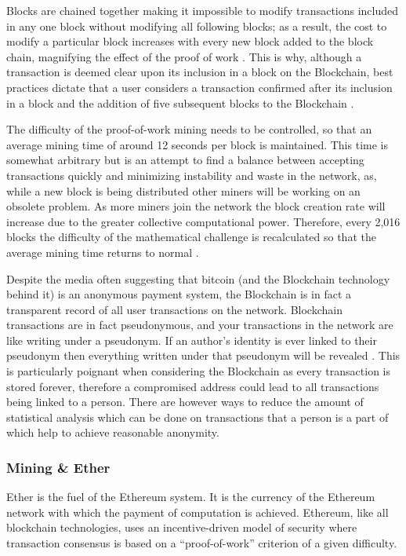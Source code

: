 \documentclass{article}
\begin{document}
Blocks are chained together making it impossible to modify transactions included in any one block without modifying all following blocks; as a result, the cost to modify a particular block increases with every new block added to the block chain, magnifying the effect of the proof of work \citep{20_developer_guide_bitcoin_2016}\citep{38_proof_of_work_-_masterpage_2016}. This is why, although a transaction is deemed clear upon its inclusion in a block on the Blockchain, best practices dictate that a user considers a transaction confirmed after its inclusion in a block and the addition of five subsequent blocks to the Blockchain \citep{27_confirmation_-_bitcoin_wiki_2016}.

The difficulty of the proof-of-work mining needs to be controlled, so that an average mining time of around 12 seconds per block is maintained. This time is somewhat arbitrary but is an attempt to find a balance between accepting transactions quickly and minimizing instability and waste in the network, as, while a new block is being distributed other miners will be working on an obsolete problem. As more miners join the network the block creation rate will increase due to the greater collective computational power. Therefore, every 2,016 blocks the difficulty of the mathematical challenge is recalculated so that the average mining time returns to normal \citep{20_developer_guide_bitcoin_2016}\citep{26_blockchain_mining_-_distributed_ledgers_and_blockchain_technology_2016}.

Despite the media often suggesting that bitcoin (and the Blockchain technology behind it) is an anonymous payment system, the Blockchain is in fact a transparent record of all user transactions on the network. Blockchain transactions are in fact pseudonymous, and your transactions in the network are like writing under a pseudonym. If an author's identity is ever linked to their pseudonym then everything written under that pseudonym will be revealed \citep{28_anonymity_2016}. This is particularly poignant when considering the Blockchain as every transaction is stored forever, therefore a compromised address could lead to all transactions being linked to a person. There are however ways to reduce the amount of statistical analysis which can be done on transactions that a person is a part of which help to achieve reasonable anonymity.

\cleardoublepage
\subsubsection{Mining \& Ether}
Ether is the fuel of the Ethereum system. It is the currency of the Ethereum network with which the payment of computation is achieved. Ethereum, like all blockchain technologies, uses an incentive-driven model of security where transaction consensus is based on a ``proof-of-work'' criterion of a given difficulty.
\end{document}

